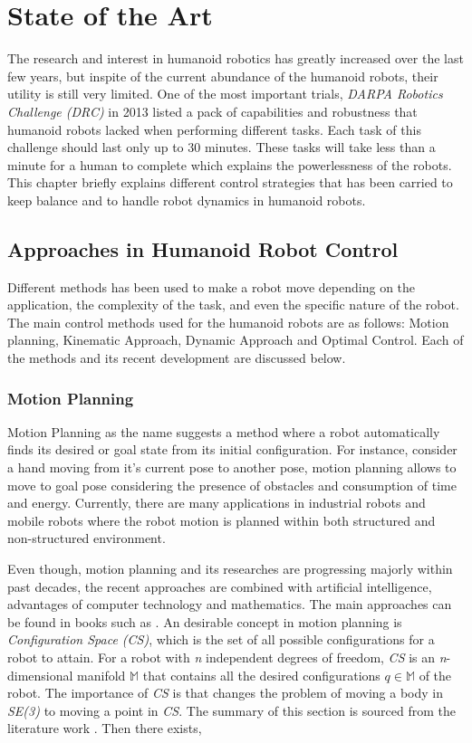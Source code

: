 \chapter{State of the Art}
\label{chapter-2}

The research and interest in humanoid robotics has greatly increased over the last few years, but inspite of the current
abundance of the humanoid robots, their utility is still very limited. One of the most important trials, \textit{DARPA 
Robotics Challenge (DRC)} in 2013 listed a pack of capabilities and robustness that humanoid robots lacked when performing 
different tasks. Each task of this challenge should last only up to 30 minutes. These tasks will take less than a minute 
for a human to complete which  explains the powerlessness of the robots. This chapter briefly explains different control 
strategies that has been carried to keep balance and to handle robot dynamics in humanoid robots.

\section{Approaches in Humanoid Robot Control}

Different methods has been used to make a robot move depending on the application, the complexity of the task, and even
the specific nature of the robot. The main control methods used for the humanoid robots are as follows: Motion planning,
Kinematic Approach, Dynamic Approach and Optimal Control. Each of the methods and its recent development are discussed
below.

\subsection{Motion Planning}

Motion Planning as the name suggests a method where a robot automatically finds its desired or goal state from its initial
configuration. For instance, consider a hand moving from it's current pose to another pose, motion planning allows to move to
goal pose considering the presence of obstacles and consumption of time and energy. Currently, there are many applications in 
industrial robots and mobile robots where the robot motion is planned within both structured and non-structured environment. 

 

Even though, motion planning and its researches are progressing majorly within past decades, the recent approaches are combined
with artificial intelligence, advantages of computer technology and mathematics. The main approaches can be found in books such as 
\cite{Latombe,LaValle2006PlanningA}. An desirable concept in motion planning is \textit{Configuration Space (CS)}, which is the set
of all possible configurations for a robot to attain. For a robot with \textit{n} independent degrees of freedom, \textit{CS} is an 
\textit{n}-dimensional manifold $\mathbb{M}$ that contains all the desired configurations $q \in \mathbb{M}$ of the robot. The importance
of \textit{CS} is that changes the problem of moving a body in \textit{SE(3)} to moving a point in \textit{CS}. The summary of this
section is sourced from the literature work \cite{ramosponce}. Then there exists,

